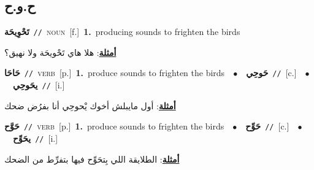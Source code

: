 \documentclass[10pt,a4paper,twoside]{article} %
\begin{document}
\begin{multicols}{2}
\vspace{-3mm}
\subsection*{\color{blue}\foreignlanguage{arabic}{ح.و.ح}\color{blue}{}} 

{\setlength\topsep{0pt}\textbf{\foreignlanguage{arabic}{تَحْوِيحَة}}\ {\color{gray}\texttt{//}\color{black}}\ \textsc{noun}\ [f.]\ \textbf{1.}~producing sounds to frighten the birds\  \begin{flushright}\color{gray}\foreignlanguage{arabic}{\textbf{\underline{\foreignlanguage{arabic}{أمثلة}}}: هلا هاي تَحْويحَة ولا نهيق؟}\end{flushright}\color{black}} \vspace{2mm}

{\setlength\topsep{0pt}\textbf{\foreignlanguage{arabic}{حَاحَا}}\ {\color{gray}\texttt{//}\color{black}}\ \textsc{verb}\ [p.]\ \textbf{1.}~produce sounds to frighten the birds\ \ $\bullet$\ \ \setlength\topsep{0pt}\textbf{\foreignlanguage{arabic}{حَوحِي}}\ {\color{gray}\texttt{//}\color{black}}\ [c.]\ \ $\bullet$\ \ \setlength\topsep{0pt}\textbf{\foreignlanguage{arabic}{يحَوحِي}}\ {\color{gray}\texttt{//}\color{black}}\ [i.]\  \begin{flushright}\color{gray}\foreignlanguage{arabic}{\textbf{\underline{\foreignlanguage{arabic}{أمثلة}}}: أول مايبلش أخوك يْحوحِي أنا بفرُض ضحك}\end{flushright}\color{black}} \vspace{2mm}

{\setlength\topsep{0pt}\textbf{\foreignlanguage{arabic}{حَوَّح}}\ {\color{gray}\texttt{//}\color{black}}\ \textsc{verb}\ [p.]\ \textbf{1.}~produce sounds to frighten the birds\ \ $\bullet$\ \ \setlength\topsep{0pt}\textbf{\foreignlanguage{arabic}{حَوِّح}}\ {\color{gray}\texttt{//}\color{black}}\ [c.]\ \ $\bullet$\ \ \setlength\topsep{0pt}\textbf{\foreignlanguage{arabic}{يحَوِّح}}\ {\color{gray}\texttt{//}\color{black}}\ [i.]\  \begin{flushright}\color{gray}\foreignlanguage{arabic}{\textbf{\underline{\foreignlanguage{arabic}{أمثلة}}}: الطلايقة اللي بِتحَوِّح فيها بتفرِّط من الضحك}\end{flushright}\color{black}} \vspace{2mm}


\end{multicols}
\end{document}

